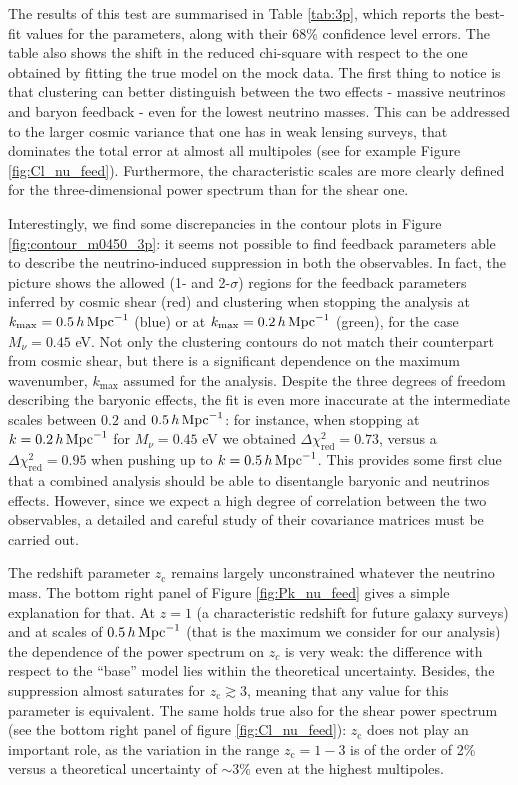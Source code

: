 \documentclass[a4paper,11pt]{article}
\def\kMpc{\, h \, {\rm Mpc}^{-1}}
\begin{document}
The results of this test are summarised in Table \ref{tab:3p}, which reports the best-fit values for the parameters, along with their 68\% confidence level errors. The table also shows the shift in the reduced chi-square with respect to the one obtained by fitting the true model on the mock data.
The first thing to notice is that clustering can better distinguish between the two effects - massive neutrinos and baryon feedback -  even for the lowest neutrino masses.
This can be addressed to the larger cosmic variance that one has in weak lensing surveys, that dominates the total error at almost all multipoles (see for example Figure \ref{fig:Cl_nu_feed}). 
Furthermore, the characteristic scales are more clearly defined for the three-dimensional power spectrum than for the shear one.

Interestingly, we find some discrepancies in the contour plots in Figure \ref{fig:contour_m0450_3p}: it seems not possible to find feedback parameters able to describe the neutrino-induced suppression in both the observables. In fact, the picture shows the allowed (1- and 2-$\sigma$) regions for the feedback parameters inferred by cosmic shear (red) and clustering when stopping the analysis at $k_\mathrm{max} = 0.5 \kMpc$ (blue) or at $k_\mathrm{max} = 0.2 \kMpc$ (green), for the case $M_\nu = 0.45$ eV.
Not only the clustering contours do not match their counterpart from cosmic shear, but there is a significant dependence on the maximum wavenumber, $k_\mathrm{max}$ assumed for the analysis. Despite the three degrees of freedom describing the baryonic effects, the fit is even more inaccurate at the intermediate scales between $0.2$ and $0.5 \kMpc$: for instance, when stopping at $k = 0.2 \kMpc$ for $M_\nu = 0.45$ eV we obtained $\Delta\chi^2_\mathrm{red} = 0.73$, versus a $\Delta\chi^2_\mathrm{red} = 0.95$ when pushing up to $k=0.5 \kMpc$.
This provides some first clue that a combined analysis should be able to disentangle baryonic and neutrinos effects. However, since we expect a high degree of correlation between the two observables, a detailed and careful study of their covariance matrices must be carried out.

The redshift parameter $z_\mathrm c$ remains largely unconstrained whatever the neutrino mass. The bottom right panel of Figure \ref{fig:Pk_nu_feed} gives a simple explanation for that. At $z = 1$ (a characteristic redshift for future galaxy surveys) and at scales of $0.5\kMpc$ (that is the maximum we consider for our analysis) the dependence of the power spectrum on $z_c$ is very weak: the difference with respect to the ``base'' model lies within the theoretical uncertainty. Besides, the suppression almost saturates for $z_\mathrm c \gtrsim 3$, meaning that any value for this parameter is equivalent. The same holds true also for the shear power spectrum (see the bottom right panel of figure \ref{fig:Cl_nu_feed}): $z_\mathrm c$ does not play an important role, as the variation in the range $z_\mathrm c = 1-3$ is of the order of 2\% versus a theoretical uncertainty of $\sim 3\%$ even at the highest multipoles.
\end{document}
